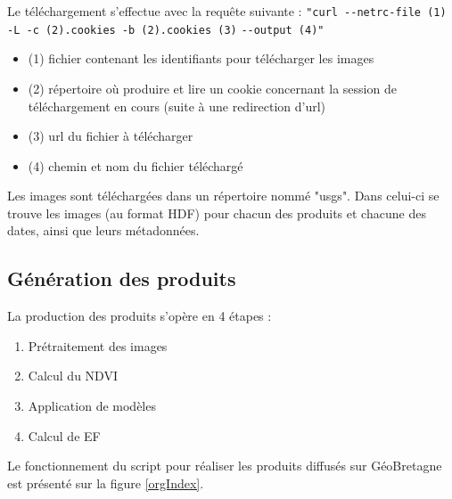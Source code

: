 \documentclass[10pt,a4paper]{article}
\begin{document}
Le téléchargement s'effectue avec la requête suivante :\newline
\verb!"curl --netrc-file (1) -L -c (2).cookies -b (2).cookies (3)! \newline \verb!--output (4)"!
\begin{itemize}
\item (1) fichier contenant les identifiants pour télécharger les images
\item (2) répertoire où produire et lire un cookie concernant la session de téléchargement en cours (suite à une redirection d'url)
\item (3) url du fichier à télécharger
\item (4) chemin et nom du fichier téléchargé
\end{itemize}

Les images sont téléchargées dans un répertoire nommé "usgs". Dans celui-ci se trouve les images (au format HDF) pour chacun des produits et chacune des dates, ainsi que leurs métadonnées.

\subsection{Génération des produits}

La production des produits s'opère en 4 étapes :

\begin{enumerate}
\item Prétraitement des images
\item Calcul du NDVI
\item Application de modèles
\item Calcul de EF
\end{enumerate}

Le fonctionnement du script pour réaliser les produits diffusés sur GéoBretagne est présenté sur la figure \ref{orgIndex}.\newpage
\end{document}

